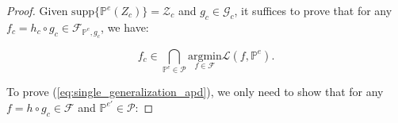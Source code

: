 \begin{proof}





Given $\text{supp}\{\mathbb{P}^e(Z_c)\}=\mathcal{Z}_c$ and $g_c\in \mathcal{G}_c$, 
it suffices to prove that for any $f_c = h_c \circ g_c \in \mathcal{F}_{\mathbb{P}^e,g_c}$, we have:

\begin{equation}
    f_c \in \bigcap_{\mathbb{P}^{e}\in \mathcal{P}} \underset{f\in \mathcal{F}}{\text{argmin}}\mathcal{L}\left(f, \mathbb{P}^e\right).    
    \label{eq:single_generalization_apd}
\end{equation}

To prove (\ref{eq:single_generalization_apd}), we only need to show that for any $f=h\circ g_c \in\mathcal{F}$ and $\mathbb{P}^{e'} \in \mathcal{P}$:


\end{proof}
